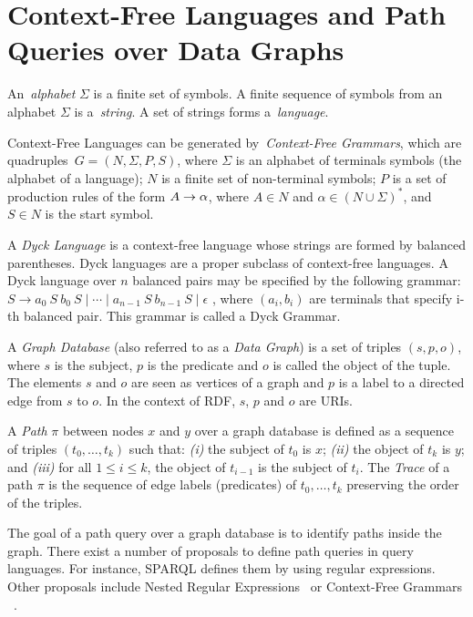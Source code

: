 \documentclass[runningheads]{llncs}
\begin{document}
\section{Context-Free Languages and Path Queries over Data Graphs}
\label{sec:grammars}

An~\emph{alphabet} $\Sigma$ is a finite set of symbols.
A finite sequence of symbols from an alphabet $\Sigma$ is a~\emph{string}.
A set of strings forms a~\emph{language}.

Context-Free Languages can be generated by~\emph{Context-Free Grammars}, which are quadruples~$G=(N,\Sigma,P,S)$, where $\Sigma$ is an alphabet of terminals symbols (the alphabet of a language); $N$ is a finite set of non-terminal symbols; $P$ is a set of production rules of the form $A \to \alpha$, where $A \in N$ and  $\alpha \in (N\cup\Sigma)^*$, and $S\in N$ is the start symbol.

A \textit{Dyck Language} is a context-free language whose strings are formed by balanced parentheses.
Dyck languages are a proper subclass of context-free languages.
A Dyck language over $n$ balanced pairs may be specified by the following grammar: $S \to a_0 \ S \ b_0  \ S \mid \cdots \mid a_{n-1} \ S \ b_{n-1} \ S \mid \epsilon$ , where $(a_i,b_i)$ are terminals that specify i-th balanced pair.
This grammar is called a Dyck Grammar.


\medskip

A \textit{Graph Database} (also referred to as a \textit{Data Graph}) is a set of triples $(s,p,o)$, where $s$ is the subject, $p$ is the predicate and $o$ is called the object of the tuple.
The elements $s$ and $o$ are seen as vertices of a graph and $p$ is a label to a directed edge from $s$ to $o$.
In the context of RDF, $s$, $p$ and $o$ are URIs.

A \textit{Path} $\pi$ between nodes $x$ and $y$ over a graph database is defined as a sequence of triples $(t_0,\dots,t_k)$ such that:
\textit{(i)} the subject of $t_0$ is $x$;
\textit{(ii)} the object of $t_k$ is $y$; and
\textit{(iii)} for all $1 \leq i \leq k$, the object of $t_{i-1}$ is the subject of $t_i$.
The \textit{Trace} of a path $\pi$ is the sequence of edge labels (predicates) of $t_0,\dots,t_k$ preserving the order of the triples. 

The goal of a path query over a graph database is to identify paths inside the graph.
There exist a number of proposals to define path queries in query languages.
For instance, SPARQL defines them by using regular expressions.
Other proposals include Nested Regular Expressions~\cite{nsparql} or Context-Free Grammars
~\cite{Hellings14,Hellings2015pathresults,fred,grigorev2016ll,azimov-grigorev2017matrix,MEDEIROS2019}.
\end{document}
